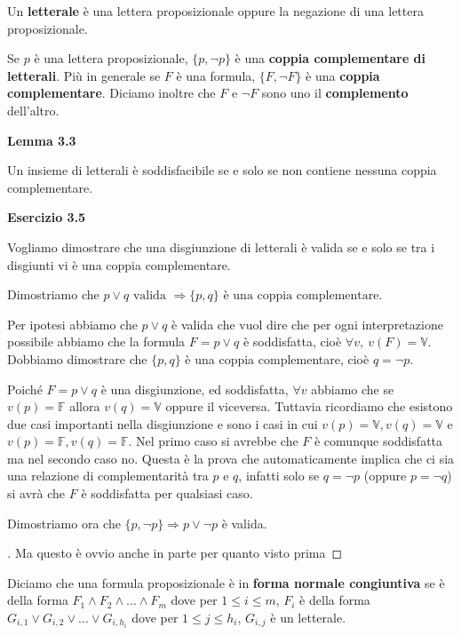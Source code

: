 \begin{flushleft}
Un \textbf{letterale} è una lettera proposizionale oppure la negazione di una 
lettera proposizionale.

Se $p$ è una lettera proposizionale, $\lbrace p, \neg{p} \rbrace$ è una
\textbf{coppia complementare di letterali}. Più in generale se $F$ è una formula, 
$\lbrace F, \neg{F} \rbrace$ è una \textbf{coppia complementare}. Diciamo inoltre
che $F$ e $\neg{F}$ sono uno il \textbf{complemento} dell'altro.

\bigskip

\textbf{Lemma 3.3}

Un insieme di letterali è soddisfacibile se e solo se non contiene nessuna coppia
complementare.

\bigskip

\textbf{Esercizio 3.5}

Vogliamo dimostrare che una disgiunzione di letterali è valida se e solo se tra 
i disgiunti vi è una coppia complementare.

\medskip

Dimostriamo che $p \lor q \text{ valida } \Rightarrow \lbrace p, q \rbrace \text{ è 
una coppia complementare}$.

\smallskip

Per ipotesi abbiamo che $p \lor q$ è valida che vuol dire che per ogni interpretazione 
possibile abbiamo che la formula $F = p \lor q$ è soddisfatta, cioè 
$\forall v, \: v(F) = \mathbb{V}$. Dobbiamo dimostrare che $\lbrace p, q \rbrace$ è 
una coppia complementare, cioè $q = \neg p$.

Poiché $F = p \lor q$ è una disgiunzione, ed soddisfatta, $\forall v$ abbiamo che 
se $v(p) = \mathbb{F}$ allora $v(q) = \mathbb{V}$ oppure il viceversa. Tuttavia ricordiamo
che esistono due casi importanti nella disgiunzione e sono i casi in cui $v(p) = \mathbb{V},
v(q) = \mathbb{V}$ e $v(p) = \mathbb{F}, v(q) = \mathbb{F}$. Nel primo caso si avrebbe che $F$
è comunque soddisfatta ma nel secondo caso no. Questa è la prova che automaticamente
implica che ci sia una relazione di complementarità tra $p$ e $q$, infatti solo se 
$q = \neg p$ (oppure $p = \neg q$) si avrà che $F$ è soddisfatta per qualsiasi caso.

\medskip

Dimostriamo ora che $\lbrace p, \neg p \rbrace \Rightarrow p \lor \neg p$ è valida.

\begin{proof}[\unskip\nopunct]
Ma questo è ovvio anche in parte per quanto visto prima
\end{proof}

\bigskip

Diciamo che una formula proposizionale è in \textbf{forma normale congiuntiva} se
è della forma $F_1 \land F_2 \land ... \land F_m$ dove per $1 \le i \le m$, $F_i$
è della forma $G_{i,1} \lor G_{i,2} \lor ... \lor G_{i,h_i}$ dove per 
$1 \le j \le h_i$, $G_{i, j}$ è un letterale.

\end{flushleft}